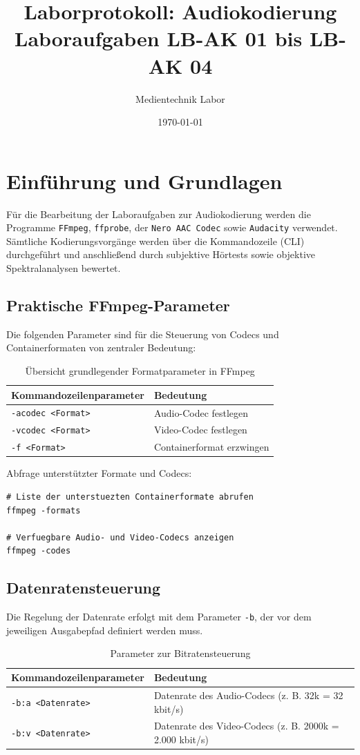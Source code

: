 \documentclass[11pt,a4paper]{article}
\title{Laborprotokoll: Audiokodierung\\ \large Laboraufgaben LB-AK 01 bis LB-AK 04}
\author{Medientechnik Labor}
\date{\today}
\begin{document}
\maketitle
\tableofcontents
\newpage

\section{Einführung und Grundlagen}
Für die Bearbeitung der Laboraufgaben zur Audiokodierung werden die Programme \texttt{FFmpeg}, \texttt{ffprobe}, der \texttt{Nero AAC Codec} sowie \texttt{Audacity} verwendet. Sämtliche Kodierungsvorgänge werden über die Kommandozeile (CLI) durchgeführt und anschließend durch subjektive Hörtests sowie objektive Spektralanalysen bewertet.

\subsection{Praktische FFmpeg-Parameter}
Die folgenden Parameter sind für die Steuerung von Codecs und Containerformaten von zentraler Bedeutung:
\begin{table}[h!]
\centering
\begin{tabular}{ll}
\toprule
\textbf{Kommandozeilenparameter} & \textbf{Bedeutung} \\
\midrule
\texttt{-acodec <Format>} & Audio-Codec festlegen \\
\texttt{-vcodec <Format>} & Video-Codec festlegen \\
\texttt{-f <Format>} & Containerformat erzwingen \\
\bottomrule
\end{tabular}
\caption{Übersicht grundlegender Formatparameter in FFmpeg}
\end{table}

Abfrage unterstützter Formate und Codecs:
\begin{lstlisting}
# Liste der unterstuezten Containerformate abrufen
ffmpeg -formats

# Verfuegbare Audio- und Video-Codecs anzeigen
ffmpeg -codes
\end{lstlisting}

\subsection{Datenratensteuerung}
Die Regelung der Datenrate erfolgt mit dem Parameter \texttt{-b}, der vor dem jeweiligen Ausgabepfad definiert werden muss. 
\begin{table}[h!]
\centering
\begin{tabular}{ll}
\toprule
\textbf{Kommandozeilenparameter} & \textbf{Bedeutung} \\
\midrule
\texttt{-b:a <Datenrate>} & Datenrate des Audio-Codecs (z. B. 32k = 32 kbit/s) \\
\texttt{-b:v <Datenrate>} & Datenrate des Video-Codecs (z. B. 2000k = 2.000 kbit/s) \\
\bottomrule
\end{tabular}
\caption{Parameter zur Bitratensteuerung}
\end{table}
\end{document}
